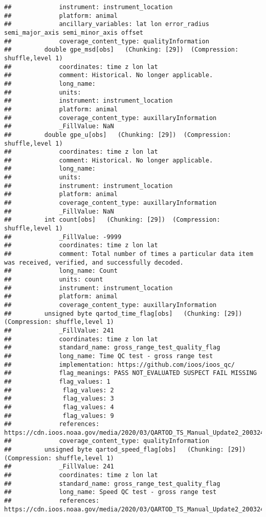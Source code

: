 \documentclass[
]{book}
\begin{document}
\begin{verbatim}
##             instrument: instrument_location
##             platform: animal
##             ancillary_variables: lat lon error_radius semi_major_axis semi_minor_axis offset
##             coverage_content_type: qualityInformation
##         double gpe_msd[obs]   (Chunking: [29])  (Compression: shuffle,level 1)
##             coordinates: time z lon lat
##             comment: Historical. No longer applicable.
##             long_name: 
##             units: 
##             instrument: instrument_location
##             platform: animal
##             coverage_content_type: auxillaryInformation
##             _FillValue: NaN
##         double gpe_u[obs]   (Chunking: [29])  (Compression: shuffle,level 1)
##             coordinates: time z lon lat
##             comment: Historical. No longer applicable.
##             long_name: 
##             units: 
##             instrument: instrument_location
##             platform: animal
##             coverage_content_type: auxillaryInformation
##             _FillValue: NaN
##         int count[obs]   (Chunking: [29])  (Compression: shuffle,level 1)
##             _FillValue: -9999
##             coordinates: time z lon lat
##             comment: Total number of times a particular data item was received, verified, and successfully decoded.
##             long_name: Count
##             units: count
##             instrument: instrument_location
##             platform: animal
##             coverage_content_type: auxillaryInformation
##         unsigned byte qartod_time_flag[obs]   (Chunking: [29])  (Compression: shuffle,level 1)
##             _FillValue: 241
##             coordinates: time z lon lat
##             standard_name: gross_range_test_quality_flag
##             long_name: Time QC test - gross range test
##             implementation: https://github.com/ioos/ioos_qc/
##             flag_meanings: PASS NOT_EVALUATED SUSPECT FAIL MISSING
##             flag_values: 1
##              flag_values: 2
##              flag_values: 3
##              flag_values: 4
##              flag_values: 9
##             references: https://cdn.ioos.noaa.gov/media/2020/03/QARTOD_TS_Manual_Update2_200324_final.pdf
##             coverage_content_type: qualityInformation
##         unsigned byte qartod_speed_flag[obs]   (Chunking: [29])  (Compression: shuffle,level 1)
##             _FillValue: 241
##             coordinates: time z lon lat
##             standard_name: gross_range_test_quality_flag
##             long_name: Speed QC test - gross range test
##             references: https://cdn.ioos.noaa.gov/media/2020/03/QARTOD_TS_Manual_Update2_200324_final.pdf

\end{verbatim}
\end{document}
